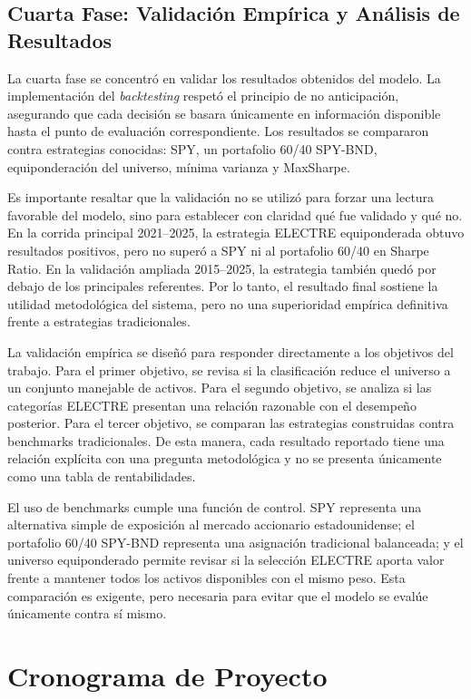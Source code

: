 \documentclass[12pt,letterpaper]{article}
\begin{document}
\subsection{Cuarta Fase: Validación Empírica y Análisis de Resultados}

La cuarta fase se concentró en validar los resultados obtenidos del modelo. La implementación del \textit{backtesting} respetó el principio de no anticipación, asegurando que cada decisión se basara únicamente en información disponible hasta el punto de evaluación correspondiente. Los resultados se compararon contra estrategias conocidas: SPY, un portafolio 60/40 SPY-BND, equiponderación del universo, mínima varianza y MaxSharpe.

Es importante resaltar que la validación no se utilizó para forzar una lectura favorable del modelo, sino para establecer con claridad qué fue validado y qué no. En la corrida principal 2021--2025, la estrategia ELECTRE equiponderada obtuvo resultados positivos, pero no superó a SPY ni al portafolio 60/40 en Sharpe Ratio. En la validación ampliada 2015--2025, la estrategia también quedó por debajo de los principales referentes. Por lo tanto, el resultado final sostiene la utilidad metodológica del sistema, pero no una superioridad empírica definitiva frente a estrategias tradicionales.

La validación empírica se diseñó para responder directamente a los objetivos del trabajo. Para el primer objetivo, se revisa si la clasificación reduce el universo a un conjunto manejable de activos. Para el segundo objetivo, se analiza si las categorías ELECTRE presentan una relación razonable con el desempeño posterior. Para el tercer objetivo, se comparan las estrategias construidas contra benchmarks tradicionales. De esta manera, cada resultado reportado tiene una relación explícita con una pregunta metodológica y no se presenta únicamente como una tabla de rentabilidades.

El uso de benchmarks cumple una función de control. SPY representa una alternativa simple de exposición al mercado accionario estadounidense; el portafolio 60/40 SPY-BND representa una asignación tradicional balanceada; y el universo equiponderado permite revisar si la selección ELECTRE aporta valor frente a mantener todos los activos disponibles con el mismo peso. Esta comparación es exigente, pero necesaria para evitar que el modelo se evalúe únicamente contra sí mismo.


\clearpage
\section{Cronograma de Proyecto}
\end{document}
